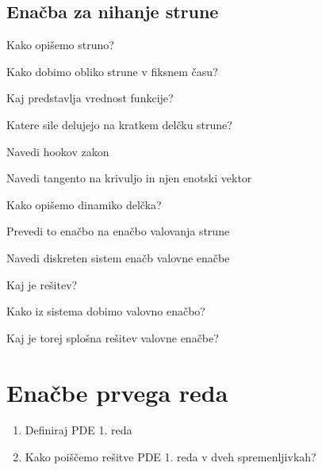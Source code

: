 \documentclass{article}
\begin{document}
    \subsection{Enačba za nihanje strune}
    \begin{enumerate}
        \item Kako opišemo struno?
        \item Kako dobimo obliko strune v fiksnem času?
        \item Kaj predstavlja vrednost funkcije?
        \item Katere sile delujejo na kratkem delčku strune?
        {\color{red}\item Navedi hookov zakon}
        {\color{blue}\item Navedi tangento na krivuljo in njen enotski vektor}
        {\color{blue}\item Kako opišemo dinamiko delčka?}
        {\color{blue}\item Prevedi to enačbo na enačbo valovanja strune}
        {\color{blue}\item Navedi diskreten sistem enačb valovne enačbe }
        {\color{blue}\item Kaj je rešitev?}
        {\color{red}\item Kako iz sistema dobimo valovno enačbo?}
        {\color{red}\item Kaj je torej splošna rešitev valovne enačbe?}
    \end{enumerate}

    \section{Enačbe prvega reda}
    \begin{enumerate}
        \item Definiraj PDE 1. reda
        \item Kako poiščemo rešitve PDE 1. reda v dveh spremenljivkah?
    \end{enumerate}
\end{document}
